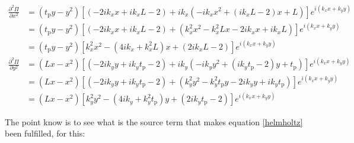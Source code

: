 \documentclass{article}[a4paper, 12pt]
\begin{document}
\begin{equation*}
    \begin{aligned}
        \frac{\partial^2\Pi}{\partial x^2} &= \left(t_{\mathrm{p}}y-y^2\right)\left[\left(-2ik_x x + ik_xL-2 \right)+ik_x\left( -ik_x x^2 + \left( ik_xL-2 \right)x + L\right) \right]e^{i\left( k_xx + k_yy \right)} \\[1.5ex]
        &= \left(t_{\mathrm{p}}y-y^2\right)\left[\left(-2ik_x x + ik_xL-2 \right)+\left( k_x^2 x^2 -k_x^2Lx - 2ik_xx + ik_xL\right) \right]e^{i\left( k_xx + k_yy \right)}\\[1.5ex]
        &= \left(t_{\mathrm{p}}y-y^2\right)\left[ k_x^2 x^2 - \left(4ik_x + k_x^2L \right)x + \left( 2ik_xL-2 \right)   \right]e^{i\left( k_xx + k_yy \right)}\\[2ex]   
        \frac{\partial^2\Pi}{\partial y^2} &= \left(Lx-x^2\right)\left[\left(-2ik_y y + ik_yt_{\mathrm{p}}-2 \right)+ik_y\left( -ik_y y^2 + \left( ik_yt_{\mathrm{p}}-2 \right)y + t_{\mathrm{p}}\right) \right]e^{i\left( k_xx + k_yy \right)} \\[1.5ex]
        &= \left(Lx-x^2\right)\left[\left(-2ik_y y + ik_yt_{\mathrm{p}}-2 \right)+\left( k_y^2 y^2 -k_y^2t_{\mathrm{p}}y - 2ik_yy + ik_yt_{\mathrm{p}}\right) \right]e^{i\left( k_xx + k_yy \right)}\\[1.5ex]
        &= \left(Lx-x^2\right)\left[ k_y^2 y^2 - \left(4ik_y + k_y^2t_{\mathrm{p}} \right)y + \left( 2ik_yt_{\mathrm{p}}-2 \right)   \right]e^{i\left( k_xx + k_yy \right)} 
    \end{aligned}
\end{equation*}

The point know is to see what is the source term that makes equation \eqref{helmholtz} been fulfilled, for this:



\end{document}

